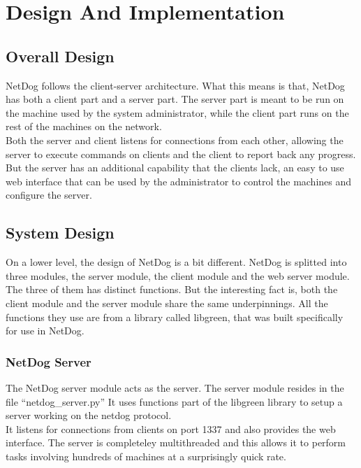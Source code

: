 \chapter{Design And Implementation}

\section{Overall Design}
\par
NetDog follows the client-server architecture. What this means is that, NetDog
has both a client part and a server part. The server part is meant to be run
on the machine used by the system administrator, while the client part runs
on the rest of the machines on the network.\\

Both the server and client listens for connections from each other, allowing
the server to execute commands on clients and the client to report back any
progress. But the server has an additional capability that the clients lack, an
easy to use web interface that can be used by the administrator to control the
machines and configure the server.

\section{System Design}
\par
On a lower level, the design of NetDog is a bit different. NetDog is splitted
into three modules, the server module, the client module and the web server
module. The three of them has distinct functions. But the interesting fact is,
both the client module and the server module share the same underpinnings. All
the functions they use are from a library called libgreen, that was built
specifically for use in NetDog.


\subsection{NetDog Server}
\par
The NetDog server module acts as the server. The server module resides in the
file ``netdog\_server.py'' It uses functions part of the libgreen library to
setup a server working on the netdog protocol.\\

It listens for connections from clients on port 1337 and also provides the web
interface. The server is completeley multithreaded and this allows it to
perform tasks involving hundreds of machines at a surprisingly quick rate.

